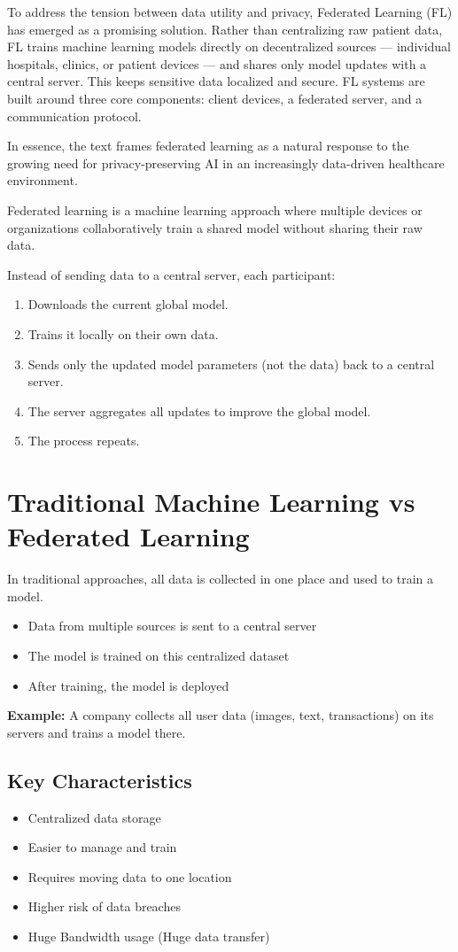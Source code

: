 \documentclass[12pt]{article}
\begin{document}
To address the tension between data utility and privacy, Federated Learning (FL) has emerged as a promising solution. Rather than centralizing raw patient data, FL trains machine learning models directly on decentralized sources — individual hospitals, clinics, or patient devices — and shares only model updates with a central server. This keeps sensitive data localized and secure. FL systems are built around three core components: client devices, a federated server, and a communication protocol.

In essence, the text frames federated learning as a natural response to the growing need for privacy-preserving AI in an increasingly data-driven healthcare environment.

Federated learning is a machine learning approach where multiple devices or organizations collaboratively train a shared model without sharing their raw data.

Instead of sending data to a central server, each participant:
\begin{enumerate}
    \item Downloads the current global model.
    \item Trains it locally on their own data.
    \item Sends only the updated model parameters (not the data) back to a central server.
    \item The server aggregates all updates to improve the global model.
    \item The process repeats.
\end{enumerate}

\section{Traditional Machine Learning vs Federated Learning}
\label{sec:comparison}

In traditional approaches, all data is collected in one place and used to train a model.
\begin{itemize}
    \item Data from multiple sources is sent to a central server
    \item The model is trained on this centralized dataset
    \item After training, the model is deployed
\end{itemize}
\textbf{Example:} A company collects all user data (images, text, transactions) on its servers and trains a model there.

\subsection{Key Characteristics}
\begin{itemize}
    \item Centralized data storage
    \item Easier to manage and train
    \item Requires moving data to one location
    \item Higher risk of data breaches
    \item Huge Bandwidth usage (Huge data transfer)
\end{itemize}
\end{document}
